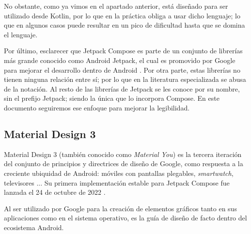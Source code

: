             No obstante, como ya vimos en el apartado anterior, está diseñado para ser utilizado desde Kotlin, por lo 
            que en la práctica obliga a usar dicho lenguaje; lo que en algunos casos puede resultar en un pico de 
            dificultad hasta que se domina el lenguaje.

            Por último, esclarecer que Jetpack Compose es parte de un conjunto de librerías más grande conocido como 
            Android Jetpack, el cual es promovido por Google para mejorar el desarrollo dentro de Android 
            \cite{huaman_que_2018} \cite{noauthor_recursos_nodate}. Por otra
            parte, estas librerías no tienen ninguna relación entre sí; por lo que en la literatura especializada se 
            abusa de la notación. Al resto de las librerías de Jetpack se les conoce
            por su nombre, sin el prefijo Jetpack; siendo la única que lo incorpora Compose. En este documento 
            seguiremos ese enfoque para mejorar la legibilidad.
        
        \subsection{Material Design 3}
            Material Design 3 (también conocido como \textit{Material You}) es la tercera iteración del 
            conjunto de principios y directrices de diseño de Google, 
            como respuesta a la creciente ubiquidad de Android: móviles con pantallas
            plegables, \textit{smartwatch}, televisores \cite{ramirez_que_2022}... 
            Su primera implementación estable para Jetpack Compose fue lanzada el 
            24 de octubre de 2022 \cite{singh_material_2022}.
            
            Al ser utilizado por Google para la creación de elementos 
            gráficos tanto en sus aplicaciones como en el sistema operativo, es la guía de diseño de facto dentro del
            ecosistema Android.

